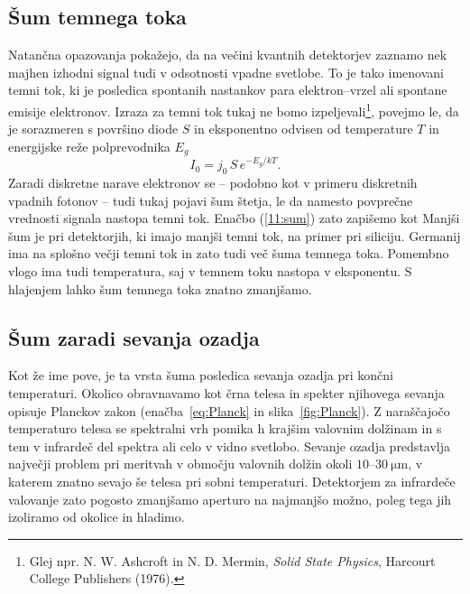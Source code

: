 \subsection*{Šum temnega toka} 
Natančna opazovanja pokažejo, da na večini kvantnih detektorjev zaznamo 
nek majhen izhodni signal tudi v odsotnosti vpadne svetlobe. 
To je tako imenovani temni tok, ki je posledica
spontanih nastankov para elektron--vrzel ali spontane emisije elektronov. 
Izraza za temni tok tukaj ne bomo 
izpeljevali\footnote{Glej npr. N. W. Ashcroft in N. D. Mermin, {\it Solid State Physics}, Harcourt College
Publishers (1976).},
povejmo le, da je sorazmeren s površino diode $S$ in 
eksponentno odvisen od temperature $T$ in energijske reže polprevodnika $E_g$
\begin{equation}
I_0 = j_0\, S\, e^{-E_g/kT}.
\end{equation}
Zaradi diskretne narave elektronov se -- podobno
kot v primeru diskretnih vpadnih fotonov -- tudi tukaj pojavi šum štetja, le da 
namesto povprečne vrednosti signala nastopa temni tok. 
Enačbo (\ref{11:sum}) zato zapišemo kot 
Manjši šum je pri detektorjih, ki imajo manjši temni tok, na primer pri siliciju.
Germanij  ima na splošno večji temni tok in zato tudi več šuma temnega toka. Pomembno
vlogo ima tudi temperatura, saj v temnem toku nastopa v eksponentu. S hlajenjem lahko 
šum temnega toka znatno zmanjšamo. 

\subsection*{Šum zaradi sevanja ozadja}
Kot že ime pove, je ta vrsta šuma posledica sevanja ozadja pri končni temperaturi.
Okolico obravnavamo kot črna telesa 
in spekter njihovega sevanja opisuje Planckov 
zakon (enačba~\ref{eq:Planck} in slika~\ref{fig:Planck}). Z naraščajočo temperaturo telesa se 
spektralni vrh pomika h krajšim valovnim dolžinam in s tem 
v infrardeč del spektra ali celo v vidno svetlobo. 
Sevanje ozadja predstavlja največji problem pri meritvah v
območju valovnih dolžin okoli $10$--$30~\si{\micro\meter}$, v katerem znatno sevajo še telesa 
pri sobni temperaturi. Detektorjem za infrardeče valovanje zato pogosto zmanjšamo aperturo 
na najmanjšo možno, poleg tega jih izoliramo od okolice in hladimo. 


